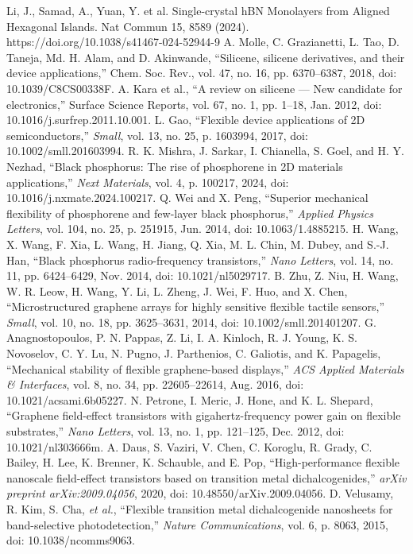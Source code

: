 \documentclass[conference]{IEEEtran}
\begin{document}
\begin{thebibliography}{00}
 Li, J., Samad, A., Yuan, Y. et al. Single-crystal hBN Monolayers from Aligned Hexagonal Islands. Nat Commun 15, 8589 (2024). https://doi.org/10.1038/s41467-024-52944-9
 A. Molle, C. Grazianetti, L. Tao, D. Taneja, Md. H. Alam, and D. Akinwande, ``Silicene, silicene derivatives, and their device applications,'' Chem. Soc. Rev., vol. 47, no. 16, pp. 6370–6387, 2018, doi: 10.1039/C8CS00338F.
 A. Kara et al., ``A review on silicene — New candidate for electronics,'' Surface Science Reports, vol. 67, no. 1, pp. 1–18, Jan. 2012, doi: 10.1016/j.surfrep.2011.10.001.
 L. Gao, ``Flexible device applications of 2D semiconductors,'' \textit{Small}, vol. 13, no. 25, p. 1603994, 2017, doi: 10.1002/smll.201603994.
 R. K. Mishra, J. Sarkar, I. Chianella, S. Goel, and H. Y. Nezhad, ``Black phosphorus: The rise of phosphorene in 2D materials applications,'' \textit{Next Materials}, vol. 4, p. 100217, 2024, doi: 10.1016/j.nxmate.2024.100217.
 Q. Wei and X. Peng, ``Superior mechanical flexibility of phosphorene and few-layer black phosphorus,'' \textit{Applied Physics Letters}, vol. 104, no. 25, p. 251915, Jun. 2014, doi: 10.1063/1.4885215.
 H. Wang, X. Wang, F. Xia, L. Wang, H. Jiang, Q. Xia, M. L. Chin, M. Dubey, and S.-J. Han, ``Black phosphorus radio-frequency transistors,'' \textit{Nano Letters}, vol. 14, no. 11, pp. 6424–6429, Nov. 2014, doi: 10.1021/nl5029717.
 B. Zhu, Z. Niu, H. Wang, W. R. Leow, H. Wang, Y. Li, L. Zheng, J. Wei, F. Huo, and X. Chen, ``Microstructured graphene arrays for highly sensitive flexible tactile sensors,'' \textit{Small}, vol. 10, no. 18, pp. 3625–3631, 2014, doi: 10.1002/smll.201401207.
 G. Anagnostopoulos, P. N. Pappas, Z. Li, I. A. Kinloch, R. J. Young, K. S. Novoselov, C. Y. Lu, N. Pugno, J. Parthenios, C. Galiotis, and K. Papagelis, ``Mechanical stability of flexible graphene-based displays,'' \textit{ACS Applied Materials \& Interfaces}, vol. 8, no. 34, pp. 22605–22614, Aug. 2016, doi: 10.1021/acsami.6b05227.
 N. Petrone, I. Meric, J. Hone, and K. L. Shepard, ``Graphene field-effect transistors with gigahertz-frequency power gain on flexible substrates,'' \textit{Nano Letters}, vol. 13, no. 1, pp. 121–125, Dec. 2012, doi: 10.1021/nl303666m.
 A. Daus, S. Vaziri, V. Chen, C. Koroglu, R. Grady, C. Bailey, H. Lee, K. Brenner, K. Schauble, and E. Pop, ``High-performance flexible nanoscale field-effect transistors based on transition metal dichalcogenides,'' \textit{arXiv preprint arXiv:2009.04056}, 2020, doi: 10.48550/arXiv.2009.04056.
 D. Velusamy, R. Kim, S. Cha, \textit{et al.}, ``Flexible transition metal dichalcogenide nanosheets for band-selective photodetection,'' \textit{Nature Communications}, vol. 6, p. 8063, 2015, doi: 10.1038/ncomms9063.
\end{thebibliography}
\end{document}

